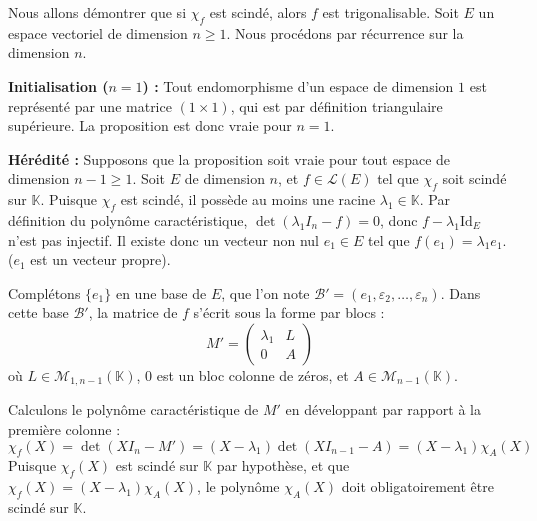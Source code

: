 \documentclass[11pt,a4paper]{article}
\begin{document}
Nous allons démontrer que si $\chi_f$ est scindé, alors $f$ est trigonalisable.
Soit $E$ un espace vectoriel de dimension $n \geq 1$. Nous procédons par récurrence sur la dimension $n$.

\textbf{Initialisation ($n = 1$) :}
Tout endomorphisme d'un espace de dimension $1$ est représenté par une matrice $(1 \times 1)$, qui est par définition triangulaire supérieure. La proposition est donc vraie pour $n=1$.

\textbf{Hérédité :}
Supposons que la proposition soit vraie pour tout espace de dimension $n-1 \geq 1$.
Soit $E$ de dimension $n$, et $f \in \mathcal{L}(E)$ tel que $\chi_f$ soit scindé sur $\mathbb{K}$.
Puisque $\chi_f$ est scindé, il possède au moins une racine $\lambda_1 \in \mathbb{K}$.
Par définition du polynôme caractéristique, $\det(\lambda_1 I_n - f) = 0$, donc $f - \lambda_1 \text{Id}_E$ n'est pas injectif.
Il existe donc un vecteur non nul $e_1 \in E$ tel que $f(e_1) = \lambda_1 e_1$. ($e_1$ est un vecteur propre).

Complétons $\{e_1\}$ en une base de $E$, que l'on note $\mathcal{B}' = (e_1, \varepsilon_2, \ldots, \varepsilon_n)$.
Dans cette base $\mathcal{B}'$, la matrice de $f$ s'écrit sous la forme par blocs :
$$ M' = \begin{pmatrix} \lambda_1 & L \\ 0 & A \end{pmatrix} $$
où $L \in \mathcal{M}_{1, n-1}(\mathbb{K})$, $0$ est un bloc colonne de zéros, et $A \in \mathcal{M}_{n-1}(\mathbb{K})$.

Calculons le polynôme caractéristique de $M'$ en développant par rapport à la première colonne :
$$ \chi_f(X) = \det(XI_n - M') = (X - \lambda_1) \det(XI_{n-1} - A) = (X - \lambda_1) \chi_A(X) $$
Puisque $\chi_f(X)$ est scindé sur $\mathbb{K}$ par hypothèse, et que $\chi_f(X) = (X - \lambda_1)\chi_A(X)$, le polynôme $\chi_A(X)$ doit obligatoirement être scindé sur $\mathbb{K}$.
\end{document}
